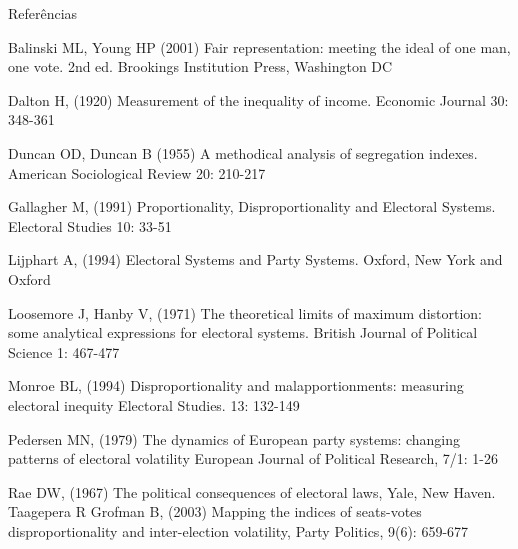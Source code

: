 \begin{frame}{Referências}

Balinski ML, Young HP (2001) Fair representation: meeting the ideal of one man, one vote. 2nd ed. Brookings Institution Press, Washington DC

Dalton H, (1920) Measurement of the inequality of income. Economic Journal 30: 348-361

Duncan OD, Duncan B (1955) A methodical analysis of segregation indexes. American Sociological Review 20: 210-217

Gallagher M, (1991) Proportionality, Disproportionality and Electoral Systems. Electoral Studies 10: 33-51

Lijphart A, (1994) Electoral Systems and Party Systems. Oxford, New York and Oxford

Loosemore J, Hanby V, (1971) The theoretical limits of maximum distortion: some analytical expressions for electoral systems. British Journal of Political Science 1: 467-477

Monroe BL, (1994) Disproportionality and malapportionments: measuring electoral inequity Electoral Studies. 13: 132-149

Pedersen MN, (1979) The dynamics of European party systems: changing patterns of electoral volatility European Journal of Political Research, 7/1: 1-26

Rae DW, (1967) The political consequences of electoral laws, Yale, New Haven.
Taagepera R Grofman B, (2003) Mapping the indices of seats-votes disproportionality and inter-election volatility, Party Politics, 9(6): 659-677


\end{frame}
